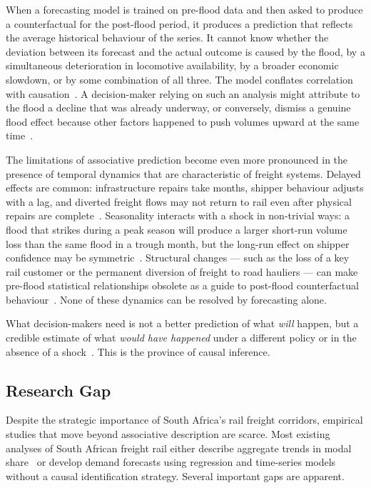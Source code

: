 When a forecasting model is trained on pre-flood data and then asked
to produce a counterfactual for the post-flood period, it produces
a prediction that reflects the average historical behaviour of the
series.
It cannot know whether the deviation between its forecast and the
actual outcome is caused by the flood, by a simultaneous deterioration
in locomotive availability, by a broader economic slowdown, or by
some combination of all three.
The model conflates correlation with causation~\parencite{pearl2009}.
A decision-maker relying on such an analysis might attribute to the
flood a decline that was already underway, or conversely, dismiss a
genuine flood effect because other factors happened to push volumes
upward at the same time~\parencite{abadie2010}.

The limitations of associative prediction become even more pronounced
in the presence of temporal dynamics that are characteristic of
freight systems.
Delayed effects are common: infrastructure repairs take months,
shipper behaviour adjusts with a lag, and diverted freight flows
may not return to rail even after physical repairs are
complete~\parencite{cavallo2013}.
Seasonality interacts with a shock in non-trivial ways: a flood that
strikes during a peak season will produce a larger short-run volume
loss than the same flood in a trough month, but the long-run effect
on shipper confidence may be symmetric~\parencite{hyndman2018forecasting}.
Structural changes --- such as the loss of a key rail customer or
the permanent diversion of freight to road hauliers --- can make
pre-flood statistical relationships obsolete as a guide to
post-flood counterfactual behaviour~\parencite{stander2005}.
None of these dynamics can be resolved by forecasting alone.

What decision-makers need is not a better prediction of what
\emph{will} happen, but a credible estimate of what \emph{would have
happened} under a different policy or in the absence of a
shock~\parencite{pearl2009, abadie2010}.
This is the province of causal inference.

\subsection{Research Gap}
\label{sec:gap}

Despite the strategic importance of South Africa's rail freight
corridors, empirical studies that move beyond associative
description are scarce.
Most existing analyses of South African freight rail either describe
aggregate trends in modal share~\parencite{stander2005, havenga2021} or
develop demand forecasts using regression and time-series models
without a causal identification strategy.
Several important gaps are apparent.

